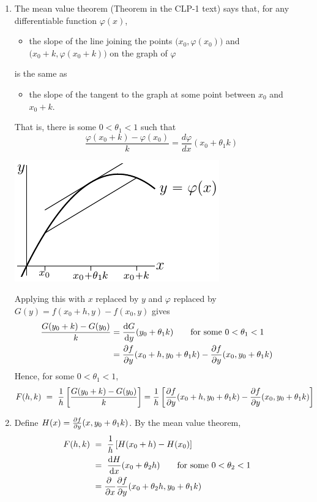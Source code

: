 \begin{enumerate}[(1)]
\item %
The mean value theorem (Theorem  in the CLP-1 text)
says that, for any differentiable function $\varphi(x)$, 
\begin{itemize}\itemsep0pt \parskip0pt 
\item the slope of the line joining the 
points $\big(x_0,\varphi(x_0)\big)$ and $\big(x_0+k,\varphi(x_0+k)\big)$ on 
the graph of $\varphi$ 
\end{itemize}
is the same as
\begin{itemize}\itemsep0pt \parskip0pt 
\item
the slope of the tangent to the graph 
at some point between $x_0$ and $x_0+k$. 
\end{itemize}
That is, there is some $0<\theta_1<1$ such that
$$
\frac{\varphi(x_0+k)-\varphi(x_0)}{k}=\frac{d\varphi}{dx}(x_0+\theta_1 k)
$$
\begin{efig}
\begin{center}
   \includegraphics{mvt.pdf}
\end{center}
\end{efig}
Applying this with $x$ replaced by $y$ and $\varphi$ replaced by $G(y)=f(x_0+h,y)-f(x_0,y)$ gives
\begin{align*}
\frac{G(y_0+k)-G(y_0)}{k}
&=\diff{G}{y}(y_0+\theta_1 k)
\qquad\text{for some $0<\theta_1<1$}\cr
&=\pdiff{f}{y}(x_0+h,y_0+\theta_1k)
-\pdiff{f}{y}(x_0,y_0+\theta_1k)
\end{align*}
Hence, for some $0<\theta_1<1$,
\begin{align*}
F(h,k)\ &=\ \frac{1}{h}
\left[\frac{G(y_0+k)-G(y_0)}{k}\right]
=\frac{1}{h}
\left[\pdiff{f}{y}(x_0+h,y_0+\theta_1k)
-\pdiff{f}{y}(x_0,y_0+\theta_1k)\right]
\end{align*}

\item %
Define $H(x)=\pdiff{f}{y}(x,y_0+\theta_1k)$. By the mean value theorem,
\begin{align*}
F(h,k)\ &=\ \frac{1}{h}\left[H(x_0+h)-H(x_0)\right]\cr
&=\ \diff{H}{x}(x_0+\theta_2 h)
\qquad\text{for some $0<\theta_2<1$}\cr
&=\pdiff{}{x}
\pdiff{f}{y}(x_0+\theta_2 h,y_0+\theta_1k)
\end{align*}


\end{enumerate}
